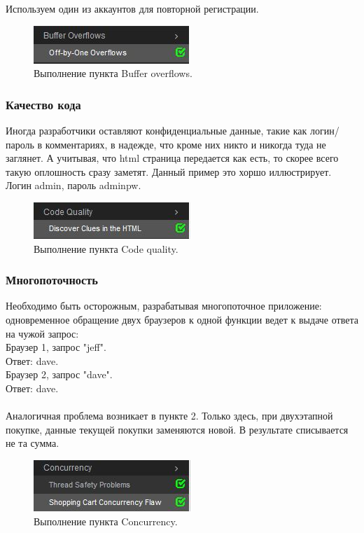 \documentclass[10pt,a4paper]{article}
\begin{document}
Используем один из аккаунтов для повторной регистрации.

\begin{figure}[h!]
\centering
\includegraphics[scale=0.7]{4.jpg}
\caption{Выполнение пункта Buffer overflows.}
\end{figure}


\subsubsection{Качество кода}

Иногда разработчики оставляют конфиденциальные данные, такие как логин/пароль в комментариях, в надежде, что кроме них никто и никогда туда не заглянет. А учитывая, что html страница передается как есть, то скорее всего такую оплошность сразу заметят. Данный пример это хоршо иллюстрирует. Логин admin, пароль adminpw.

\begin{figure}[h!]
\centering
\includegraphics[scale=0.7]{5.jpg}
\caption{Выполнение пункта Code quality.}
\end{figure}

\subsubsection{Многопоточность}

Необходимо быть осторожным, разрабатывая многопоточное приложение: одновременное обращение двух браузеров к одной функции ведет к выдаче ответа на чужой запрос:\\
Браузер 1, запрос "jeff".\\
Ответ: 	dave.\\
Браузер 2, запрос "dave". \\
Ответ: 	dave.\\
\\

Аналогичная проблема возникает в пункте 2. Только здесь, при двухэтапной покупке, данные текущей покупки заменяются новой. В результате списывается не та сумма.

\begin{figure}[h!]
\centering
\includegraphics[scale=0.7]{6.jpg}
\caption{Выполнение пункта Concurrency.}
\end{figure}
\end{document}
